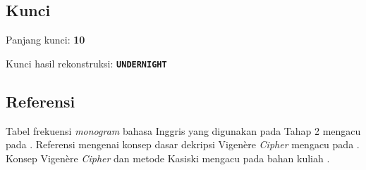 

\subsection*{Kunci}

Panjang kunci: \textbf{10}

Kunci hasil rekonstruksi: \textbf{\texttt{UNDERNIGHT}}

\subsection*{Referensi}

Tabel frekuensi \textit{monogram} bahasa Inggris yang digunakan pada Tahap 2 mengacu pada \cite{cornell-freq}. Referensi mengenai konsep dasar dekripsi Vigen\`ere \textit{Cipher} mengacu pada \cite{vigenere-gfg}. Konsep Vigen\`ere \textit{Cipher} dan metode Kasiski mengacu pada bahan kuliah \cite{munir-klasik2}.
